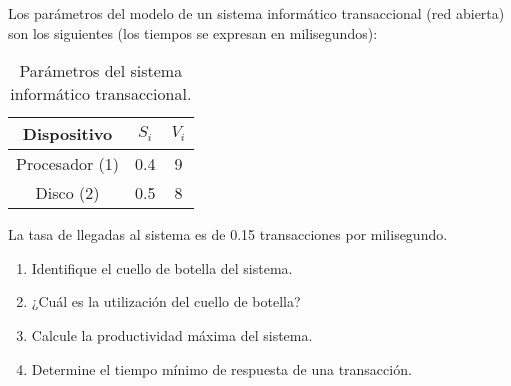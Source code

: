 \begin{ejercicio}\label{ej:5.12}
    Los parámetros del modelo de un sistema informático transaccional (red abierta) son los siguientes (los tiempos se expresan en milisegundos):
    \begin{table}[h]
        \centering
        \begin{tabular}{|c|c|c|}
            \hline
            Dispositivo & $S_i$ & $V_i$ \\
            \hline
            Procesador (1) & 0.4 & 9 \\
            Disco (2) & 0.5 & 8 \\
            \hline
        \end{tabular}
        \caption{Parámetros del sistema informático transaccional.}
        \label{tab:5.12}
    \end{table}
    La tasa de llegadas al sistema es de 0.15 transacciones por milisegundo.
    \begin{enumerate}
        \item Identifique el cuello de botella del sistema.
        \item ¿Cuál es la utilización del cuello de botella?
        \item Calcule la productividad máxima del sistema.
        \item Determine el tiempo mínimo de respuesta de una transacción.
    \end{enumerate}
\end{ejercicio}
\begin{comment}
\solucion
    \begin{enumerate}
        \item El cuello de botella del sistema es el disco.
        \item La utilización del cuello de botella es 0.6.
        \item La productividad máxima del sistema es 0.25 transacciones/ms.
        \item El tiempo mínimo de respuesta de una transacción es 7.6 ms.
    \end{enumerate}
\end{comment}

